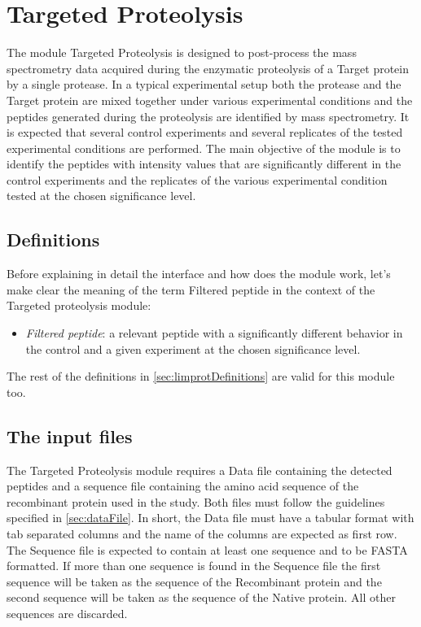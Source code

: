 \chapter{Targeted Proteolysis}
\label{chap:tarprot}

The module Targeted Proteolysis is designed to post-process the mass spectrometry
data acquired during the enzymatic proteolysis of a Target protein by a single
protease. In a typical experimental setup both the protease and the Target protein
are mixed together under various experimental conditions and the peptides generated
during the proteolysis are identified by mass spectrometry. It is expected that
several control experiments and several replicates of the tested experimental
conditions are performed. The main objective of the module is to identify the peptides
with intensity values that are significantly different in the control experiments
and the replicates of the various experimental condition tested at the chosen
significance level.

\section{Definitions}

Before explaining in detail the interface and how does the module work, let's make
clear the meaning of the term Filtered peptide in the context of the Targeted 
proteolysis module:

\begin{itemize}
    \item \textit{Filtered peptide}: a relevant peptide with a significantly different
    behavior in the control and a given experiment at the chosen significance level.
    \label{par:tarprotPIP}
\end{itemize}

The rest of the definitions in \autoref{sec:limprotDefinitions} are valid for this
module too.

\section{The input files}

The Targeted Proteolysis module requires a Data file containing the detected peptides
and a sequence file containing the amino acid sequence of the recombinant protein
used in the study. Both files must follow the guidelines specified in \autoref{sec:dataFile}.
In short, the Data file must have a tabular format with tab separated columns and
the name of the columns are expected as first row. The Sequence file is expected
to contain at least one sequence and to be FASTA formatted. If more than one sequence
is found in the Sequence file the first sequence will be taken as the sequence of
the Recombinant protein and the second sequence will be taken as the sequence of
the Native protein. All other sequences are discarded.

